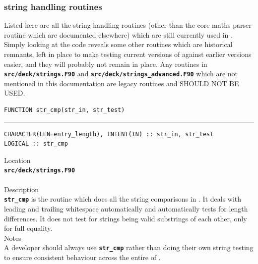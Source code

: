 \documentclass[12pt,a4paper]{article}
\newcommand{\HRule}{\rule{\linewidth}{0.5mm}}
\newcommand{\inlinecode}[1]{{\color{warwickred} \bf\texttt{#1}}}
\newcommand{\EPOCH}{{\color{warwickdark}\fontfamily{phv}\selectfont{EPOCH}}}
\newcommand{\codedef}{\begin{Verbatim}[formatcom=\color{warwickred},fontsize=\Large,hfuzz=0pt]}
\newcommand{\coderule}{
{\color{warwickred}\vspace{-0.5cm}\HRule}
\codedef}
\begin{document}
\subsubsection{{\EPOCH} string handling routines}

Listed here are all the string handling routines (other than the core maths
parser routine which are documented elsewhere) which are still currently used
in \EPOCH. Simply looking at the code reveals some other routines which are
historical remnants, left in place to make testing current versions of {\EPOCH}
against earlier versions easier, and they will probably not remain in
place. Any routines in \inlinecode{src/deck/strings.F90} and
\inlinecode{src/deck/strings\_advanced.F90} which are not mentioned in this
documentation are legacy routines and SHOULD NOT BE USED.

\pagebreak
\codedef
FUNCTION str_cmp(str_in, str_test)
\end{Verbatim}
\coderule
CHARACTER(LEN=entry_length), INTENT(IN) :: str_in, str_test
LOGICAL :: str_cmp
\end{Verbatim}
\vspace{1cm}
{\Large Location\\}
\inlinecode{src/deck/strings.F90}\\
\\[0.5cm]
{\Large Description\\}
\inlinecode{str\_cmp} is the routine which does all the string comparisons in
\EPOCH. It deals with leading and trailing whitespace automatically and
automatically tests for length differences. It does not test for strings being
valid substrings of each other, only for full equality.
\\[0.5cm]
{\Large Notes\\}
A developer should always use \inlinecode{str\_cmp} rather than doing their own
string testing to ensure consistent behaviour across the entire of \EPOCH.
\end{document}
